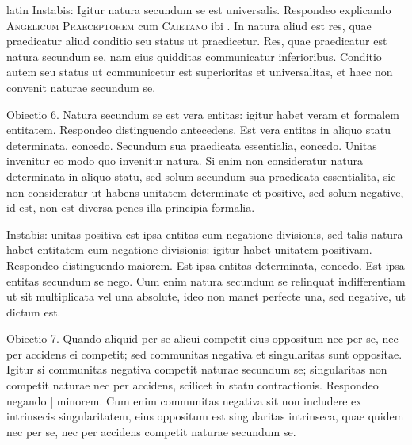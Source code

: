 \begin{otherlanguage*}{latin}
\pstart
Instabis:
 Igitur natura secundum se est universalis. Respondeo explicando \textsc{Angelicum Praeceptorem} cum \textsc{Caietano} ibi . In natura aliud est res, quae praedicatur aliud conditio seu status ut praedicetur. Res, quae praedicatur est natura secundum se, nam eius quidditas communicatur inferioribus. Conditio autem seu status ut communicetur est superioritas et universalitas, et haec non convenit naturae secundum se. 
\pend

\pstart
Obiectio 6. Natura secundum se est vera entitas:
igitur habet veram et formalem entitatem. Respondeo distinguendo antecedens. Est vera entitas in aliquo statu determinata, concedo. Secundum sua praedicata essentialia, concedo. Unitas invenitur eo modo quo invenitur natura. Si enim non consideratur natura determinata in aliquo statu, sed solum secundum sua praedicata essentialita, sic non consideratur ut habens unitatem determinate et positive, sed solum negative, id est, non est diversa penes illa principia formalia. 
\pend

\pstart
Instabis:
unitas positiva est ipsa entitas cum negatione divisionis, sed talis natura habet entitatem cum negatione divisionis:
igitur habet unitatem positivam. Respondeo distinguendo maiorem. Est ipsa entitas determinata, concedo. Est ipsa entitas secundum se nego. Cum enim natura secundum se relinquat indifferentiam ut sit multiplicata vel una absolute, ideo non manet perfecte una, sed negative, ut dictum est. 
\pend

\pstart
Obiectio 7. Quando aliquid per se alicui competit eius oppositum nec per se, nec per accidens ei competit; sed communitas negativa et singularitas sunt oppositae. Igitur si communitas negativa competit naturae secundum se; singularitas non competit naturae nec per accidens, scilicet in statu contractionis. Respondeo negando \textnormal{|} minorem. Cum enim communitas negativa sit non includere ex intrinsecis singularitatem, eius oppositum est singularitas intrinseca, quae quidem nec per se, nec per accidens competit naturae secundum se. 
\pend


\end{otherlanguage*}
